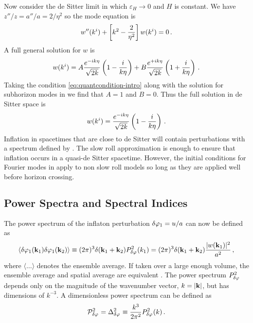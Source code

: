 Now consider the de Sitter limit in which $\varepsilon_H\rightarrow 0$ and $H$
is constant. We have $z''/z = a''/a = 2/\eta^2$ so the mode equation is \cite{Baumann2009}
% 
\begin{equation}
  w''(k^i) + \left[ k^2 -\frac{2}{\eta^2} \right]w(k^i) = 0\,.
\end{equation}
% 
A full general solution for $w$ is
% 
\begin{equation}
 w(k^i) = A\frac{e^{-ik\eta}}{\sqrt{2k}}\left(1 -\frac{i}{k\eta}\right)
	  +B\frac{e^{+ik\eta}}{\sqrt{2k}}\left(1 +\frac{i}{k\eta}\right)\,.
\end{equation}
% 
Taking the condition \eqref{eq:quantcondition-intro} along with the solution
for subhorizon modes in  we find that $A=1$ and $B=0$.
Thus the full solution in de Sitter space is \cite{book:liddle}
% 
\begin{equation}
\label{eq:wfinal-intro}
 w(k^i) = \frac{e^{-ik\eta}}{\sqrt{2k}}\left(1 -\frac{i}{k\eta}\right)\,.
\end{equation}
% 
Inflation in spacetimes that are close to de Sitter will contain perturbations
with a spectrum defined by . The slow roll approximation is
enough to ensure that inflation occurs in a quasi-de Sitter spacetime.
However, the initial conditions for Fourier modes in 
apply to non slow roll models so long as they are applied well before horizon
crossing.


\subsection{Power Spectra and Spectral Indices}
The power spectrum of the inflaton perturbation $\delta\varphi_{1} = u/a$ can now be
defined as
% 
\begin{equation}
  \langle \delta\varphi_{1}(\textbf{k}_1) \delta\varphi_{1}(\textbf{k}_2) \rangle 
   \equiv (2\pi)^3 \delta(\textbf{k}_1 + \textbf{k}_2) P_{\delta\varphi_{}}^2 (k_1)
   = (2\pi)^3 \delta(\textbf{k}_1 + \textbf{k}_2) \frac{|w(\textbf{k}_1)|^2}{a^2}\,,
\end{equation}
% 
where $\langle \ldots \rangle$ denotes the ensemble average. 
If taken over a large enough volume, the ensemble average and spatial average
are equivalent \cite{book:lyth}.
The power spectrum
$P_{\delta\varphi_{}}^2$ depends only on the magnitude of the wavenumber
vector, $k=|\bf{k}|$, but has dimensions of $k^{-3}$. A dimensionless power
spectrum
can be defined as
% 
\begin{equation}
 \label{eq:curlPrdefn-intro}
 \mathcal{P}_{\delta\varphi_{}}^2= \Delta^2_{\delta\varphi_{}} \equiv \frac{k^3}{2\pi^2}
P_{\delta\varphi_{}}^2(k)\,.
\end{equation}
% 

